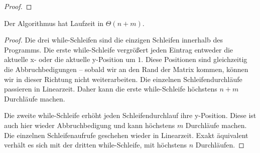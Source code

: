 \documentclass{scrartcl} %
\begin{document}
\begin{aufgabe}
\begin{enumerate}[label=(\alph*)]
\begin{proof}
            \end{proof}
            \begin{theorem*}
                Der Algorithmus hat Laufzeit in $\Theta(n + m)$.
            \end{theorem*}
            \begin{proof}\label{proof:4b}
                Die drei {\ttfamily while}-Schleifen sind die einzigen Schleifen innerhalb des Programms. Die erste {\ttfamily while}-Schleife vergrößert jeden Eintrag entweder die aktuelle {\ttfamily x}- oder die aktuelle {\ttfamily y}-Position um $1$. Diese Positionen sind gleichzeitig die Abbruchbedigungen -- sobald wir an den Rand der Matrix kommen, können wir in dieser Richtung nicht weiterarbeiten. Die einzelnen Schleifendurchläufe passieren in Linearzeit. Daher kann die erste {\ttfamily while}-Schleife höchstens $n + m$ Durchläufe machen.

                Die zweite {\ttfamily while}-Schleife erhöht jeden Schleifendurchlauf ihre {\ttfamily y}-Position. Diese ist auch hier wieder Abbruchbedigung und kann höchstens $m$ Durchläufe machen. Die einzelnen Schleifenaufrufe geschehen wieder in Linearzeit. Exakt äquivalent verhält es sich mit der dritten {\ttfamily while}-Schleife, mit höchstens $n$ Durchläufen.


\end{proof}
\end{enumerate}
\end{aufgabe}
\end{document}
